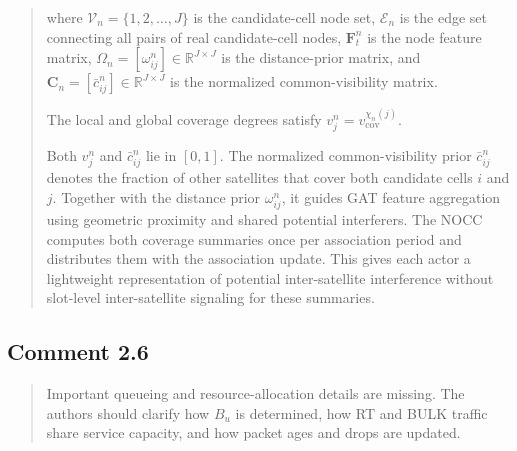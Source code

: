 \documentclass[11pt,a4paper]{article}
\begin{document}
\begin{quote}\small\color{revisionblue}
where $\mathcal V_n=\{1,2,\ldots,J\}$ is the candidate-cell node set, $\mathcal E_n$ is the edge set connecting all pairs of real candidate-cell nodes, $\mathbf F_t^n$ is the node feature matrix, $\Omega_n=[\omega_{ij}^n]\in\mathbb R^{J\times J}$ is the distance-prior matrix, and $\mathbf C_n=[\bar c_{ij}^n]\in\mathbb R^{J\times J}$ is the normalized common-visibility matrix.
\par

The local and global coverage degrees satisfy $v_j^n=v_{\mathrm{cov}}^{\chi_n(j)}$.
\par

Both $v_j^n$ and $\bar c_{ij}^n$ lie in $[0,1]$. The normalized common-visibility prior $\bar c_{ij}^n$ denotes the fraction of other satellites that cover both candidate cells $i$ and $j$. Together with the distance prior $\omega_{ij}^n$, it guides GAT feature aggregation using geometric proximity and shared potential interferers. The NOCC computes both coverage summaries once per association period and distributes them with the association update. This gives each actor a lightweight representation of potential inter-satellite interference without slot-level inter-satellite signaling for these summaries.
\par
\end{quote}


\subsection*{Comment 2.6}

\begin{quote}\small Important queueing and resource-allocation details are missing. The authors should clarify how $B_u$ is determined, how RT and BULK traffic share service capacity, and how packet ages and drops are updated.\end{quote}
\end{document}
